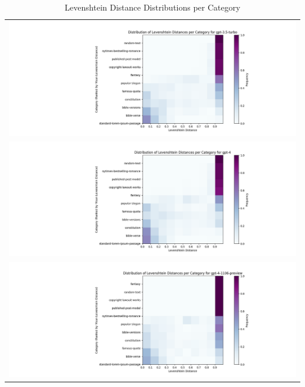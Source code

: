 \documentclass{article}
\begin{document}
\begin{table}[ht] 
\centering 
\begin{tabular}{c} 
\includegraphics[width=1.0\textwidth]{plots/categories-2d-histogram-gpt-3.5-turbo.png}  \\  
\includegraphics[width=1.0\textwidth]{plots/categories-2d-histogram-gpt-4.png}  \\ 
\includegraphics[width=1.0\textwidth]{plots/categories-2d-histogram-gpt-4-1106-preview.png}  \\ 
\end{tabular} 
\caption{Levenshtein Distance Distributions per Category} 
\label{tab:images} 
\end{table} 
\end{document}
